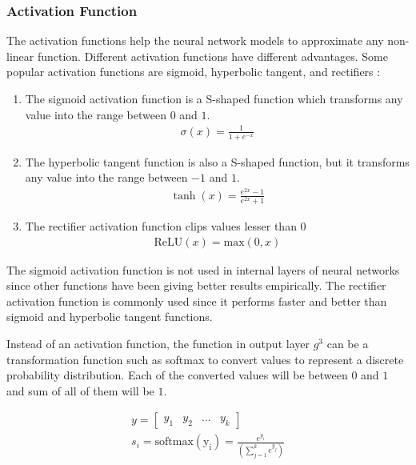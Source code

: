 \documentclass[a4paper, 11pt]{article}
\begin{document}
\subsubsection{Activation Function}

The activation functions help the neural network models to approximate any non-linear function. Different activation functions have different advantages. Some popular activation functions are sigmoid, hyperbolic tangent, and rectifiers \parencite{Goldberg2016}:

\begin{enumerate}

\item The sigmoid activation function is a S-shaped function which transforms any value into the range between $0$ and $1$.  
\begin{align*}
\sigma (x) = \frac{1}{1 + e^{-x}}
\end{align*}

\item The hyperbolic tangent function is also a S-shaped function, but it transforms any value into the range between $-1$ and $1$.
\begin{align*}
\tanh (x) = \frac{e^{2x}-1}{e^{2x}+1}
\end{align*}

\item The rectifier activation function clips values lesser than $0$
\begin{align*}
\mathrm{ReLU}(x) = \mathrm{max}(0,x)
\end{align*}

\end{enumerate}

The sigmoid activation function is not used in internal layers of neural networks since other functions have been giving better results empirically. The rectifier activation function is commonly used since it performs faster and better than sigmoid and hyperbolic tangent functions. 

Instead of an activation function, the function in output layer $g^3$ can be a transformation function such as softmax to convert values to represent a discrete probability distribution. Each of the converted values will be between $0$ and $1$ and sum of all of them will be $1$.

\begin{align*}
y = \begin{bmatrix} y_1 & y_2 & \dots & y_k \end{bmatrix} \\
s_i = \mathrm{softmax(y_i)} = \frac{e^{y_i}}{(\sum_{j=1}^ke^{y_j})}
\end{align*}
\end{document}
